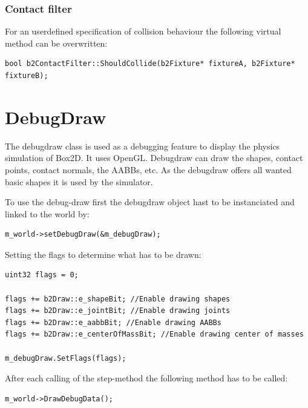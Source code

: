 \documentclass[10pt,a4paper,DIV=11]{scrreprt}
\begin{document}
\subsubsection*{Contact filter}
For an userdefined specification of collision behaviour the following virtual method can be overwritten: \\
\begin{lstlisting}[caption={The contact filter method},label=lst:box2d-contactfiler]
bool b2ContactFilter::ShouldCollide(b2Fixture* fixtureA, b2Fixture* fixtureB);
\end{lstlisting}


\section{DebugDraw}
The debugdraw class is used as a debugging feature to display the physics simulation of Box2D. It uses OpenGL. Debugdraw can draw the shapes, contact points, contact normals, the AABBs, etc.
As the debugdraw offers all wanted basic shapes it is used by the simulator.

To use the debug-draw first the debugdraw object hast to be instanciated and linked to the world by: \\

\begin{lstlisting}[caption={Linking debugdraw instance to the world instance},label=lst:box2d-ddrawset]
m_world->setDebugDraw(&m_debugDraw);
\end{lstlisting}

Setting the flags to determine what has to be drawn:

\begin{lstlisting}[caption={Initializing DebugDraw},label=lst:box2d-ddrawinit]
uint32 flags = 0;

flags += b2Draw::e_shapeBit; //Enable drawing shapes
flags += b2Draw::e_jointBit; //Enable drawing joints
flags += b2Draw::e_aabbBit; //Enable drawing AABBs
flags += b2Draw::e_centerOfMassBit; //Enable drawing center of masses

m_debugDraw.SetFlags(flags);
\end{lstlisting}


After each calling of the step-method the following method has to be called: \\

\begin{lstlisting}[caption={Using debugdraw after each step},label=lst:box2d-ddraw]
m_world->DrawDebugData();
\end{lstlisting}
\end{document}
